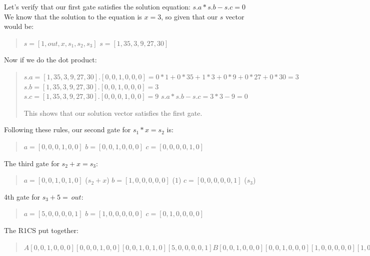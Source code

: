    Let's verify that our first gate satisfies the solution equation:
   $s . a * s . b - s . c = 0$
   We know that the solution to the equation is $ x = 3 $, so given that our $s$ vector
   would be: 
   \begin{quote}
   $s=[1,out,x,s_1,s_2,s_3]$
   $s=[1,35,3,9,27,30]$
\end{quote}

Now if we do the dot product:
\begin{quote}
   $s . a =  [1,35,3,9,27,30] . [0,0,1,0,0,0] = 0*1+0*35+1*3+0*9+0*27+0*30= 3$ 
   $s . b = [1,35,3,9,27,30] . [0,0,1,0,0,0] = 3$ 
   $s . c = [1,35,3,9,27,30] . [0,0,0,1,0,0] = 9$ 
$s . a * s . b - s . c =  3 * 3 - 9 = 0$

This shows that our solution vector satisfies the first gate.
\end{quote}

   Following these rules, our second gate for $s_1*x=s_2$ is:
   \begin{quote}
      $a = [0,0,0,1,0,0]$
      $b = [0,0,1,0,0,0]$
      $c = [0,0,0,0,1,0]$
   \end{quote}

   The third gate for $s_2+x=s_3$:
   \begin{quote}
      $a = [0,0,1,0,1,0]$ ($s_2+x$)
      $b = [1,0,0,0,0,0]$ ($1$)
      $c = [0,0,0,0,0,1]$ ($s_3$)
   \end{quote}

   4th gate for $s_3+5=~out$:
   \begin{quote}
      $a = [5,0,0,0,0,1]$
      $b = [1,0,0,0,0,0]$
      $c = [0,1,0,0,0,0]$
   \end{quote}
   
   The R1CS put together:
   \begin{quote}
      $
      A
      [0,0,1,0,0,0]
      [0,0,0,1,0,0]
      [0,0,1,0,1,0]
      [5,0,0,0,0,1]

      B 
      [0,0,1,0,0,0]
      [0,0,1,0,0,0]
      [1,0,0,0,0,0]
      [1,0,0,0,0,0]

      C 
      [0,0,0,1,0,0]
      [0,0,0,0,1,0]
      [0,0,0,0,0,1]
      [0,1,0,0,0,0]
      $
   \end{quote}
   \cite{RC23}

   \cite{VB16}
   
   
